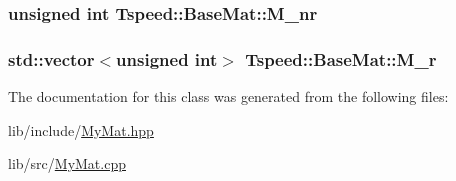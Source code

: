 \hypertarget{classTspeed_1_1BaseMat_a2122ee11f990f68aadf6046e7c02aa01}{
\subsubsection[{M\-\_\-nr}]{\setlength{\rightskip}{0pt plus 5cm}unsigned int Tspeed\-::\-Base\-Mat\-::\-M\-\_\-nr\hspace{0.3cm}{\ttfamily [protected]}}}\label{classTspeed_1_1BaseMat_a2122ee11f990f68aadf6046e7c02aa01}
\hypertarget{classTspeed_1_1BaseMat_a8147ef48c03cd2080c35e35c213c21aa}{
\subsubsection[{M\-\_\-r}]{\setlength{\rightskip}{0pt plus 5cm}std\-::vector$<$unsigned int$>$ Tspeed\-::\-Base\-Mat\-::\-M\-\_\-r\hspace{0.3cm}{\ttfamily [protected]}}}\label{classTspeed_1_1BaseMat_a8147ef48c03cd2080c35e35c213c21aa}


The documentation for this class was generated from the following files\-:\begin{DoxyCompactItemize}
\item 
lib/include/\hyperlink{MyMat_8hpp}{My\-Mat.\-hpp}\item 
lib/src/\hyperlink{MyMat_8cpp}{My\-Mat.\-cpp}\end{DoxyCompactItemize}
